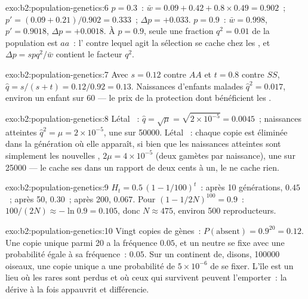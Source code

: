 \begin{solution}{exo:b2:population-genetics:6}
$p = 0.3$~: $\bar w = 0.09 + 0.42 + 0.8\times 0.49 = 0.902$~; $p' =
(0.09 + 0.21)/0.902 = 0.333$~; $\Delta p = +0.033$. $p = 0.9$~: $\bar w
= 0.998$, $p' = 0.9018$, $\Delta p = +0.0018$. À $p = 0.9$, seule une
fraction $q^{2} = 0.01$ de la population est $aa$~: l' contre
lequel agit la sélection se cache chez les , et
$\Delta p = spq^{2}/\bar w$ contient le facteur $q^{2}$.
\end{solution}

\begin{solution}{exo:b2:population-genetics:7}
Avec $s = 0.12$ contre $AA$ et $t = 0.8$ contre $SS$, $\hat q =
s/(s + t) = 0.12/0.92 = 0.13$. Naissances d'enfants malades
$\hat q^{2} = 0.017$, environ un enfant sur 60 --- le prix de la
protection dont bénéficient les .
\end{solution}

\begin{solution}{exo:b2:population-genetics:8}
Létal ~: $\hat q = \sqrt{\mu} = \sqrt{2\times 10^{-5}} =
0.0045$~; naissances atteintes $\hat q^{2} = \mu = 2\times 10^{-5}$, une
sur \num{50000}. Létal ~: chaque copie est éliminée dans la
génération où elle apparaît, si bien que les naissances atteintes sont
simplement les nouvelles , $2\mu = 4\times 10^{-5}$ (deux
gamètes par naissance), une sur
\num{25000} --- le  cache ses  dans un rapport de deux
cents à un, le  ne cache rien.
\end{solution}

\begin{solution}{exo:b2:population-genetics:9}
$H_t = 0.5\,(1 - 1/100)^{t}$~: après 10 générations, $0.45$~; après 50,
$0.30$~; après 200, $0.067$. Pour $(1 - 1/2N)^{100} = 0.9$~:
$100/(2N) \approx -\ln 0.9 = 0.105$, donc $N \approx 475$, environ 500
reproducteurs.
\end{solution}

\begin{solution}{exo:b2:population-genetics:10}
Vingt copies de gènes~: $P(\text{absent}) = 0.9^{20} = 0.12$. Une copie
unique parmi 20 a la fréquence $0.05$, et un  neutre se fixe avec
une probabilité égale à sa fréquence~: $0.05$. Sur un continent de,
disons, \num{100000} oiseaux, une copie unique a une probabilité de
$5\times 10^{-6}$ de se fixer. L'île est un lieu où les  rares
sont perdus et où ceux qui survivent peuvent l'emporter~: la dérive à la
fois appauvrit et différencie.
\end{solution}

